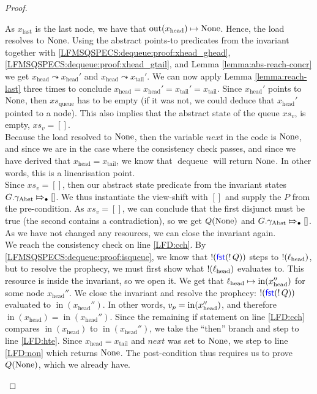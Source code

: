 \documentclass[a4paper, 10pt]{report}
\theoremstyle{definition}
\newcommand{\dequeue}{\operatorname{dequeue}}
\newcommand{\xsqueue}{xs_{\mathrm{queue}}}
\newcommand{\locN}[1]{\loc_{\mathrm{#1}}}
\newcommand{\lochead}{\locN{head}}
\newcommand{\nIn}[1]{\operatorname{in}(#1)}
\newcommand{\nOut}[1]{\operatorname{out}(#1)}
\newcommand{\node}{x}
\newcommand{\nodeN}[1]{\node_{\mathrm{#1}}}
\newcommand{\nodehead}{\nodeN{head}}
\newcommand{\nodetail}{\nodeN{tail}}
\newcommand{\nodelast}{\nodeN{last}}
\newcommand{\absvalueList}{xs_v}
\newcommand{\prophval}{\val_p}
\newcommand{\Qg}{G}
\newcommand{\gabst}{\gname_{\mathrm{Abst}}}
\newcommand{\abstractstateauth}[2]{#1 \Mapsto_{\bullet} #2}
\newcommand{\reach}[2]{#1 \leadsto #2}
\begin{document}
\begin{proof}
\begin{itemize}
\begin{itemize}
      As $\nodelast$ is the last node, we have that $\nOut{\nodehead} \mapsto \None$. Hence, the load resolves to $\operatorname{None}$. Using the abstract points-to predicates from the invariant together with \ref{LFMSQSPECS:dequeue:proof:xhead_ghead}, \ref{LFMSQSPECS:dequeue:proof:xhead_gtail}, and Lemma \ref{lemma:abs-reach-concr} we get $\reach{\nodehead}{\nodehead'}$ and $\reach{\nodehead}{\nodetail'}$. We can now apply Lemma \ref{lemma:reach-last} three times to conclude $\nodehead = \nodehead' = \nodetail' = \nodetail$. Since $\nodehead'$ points to $\operatorname{None}$, then $\xsqueue$ has to be empty (if it was not, we could deduce that $\nodehead'$ pointed to a node). This also implies that the abstract state of the queue $\absvalueList$, is empty, $\absvalueList = []$.\\
      Because the load resolved to $\operatorname{None}$, then the variable $next$ in the code is $\operatorname{None}$, and since we are in the case where the consistency check passes, and since we have derived that $\nodehead = \nodetail$, we know that $\dequeue$ will return $\operatorname{None}$. In other words, this is a linearisation point.\\
      Since $\absvalueList = []$, then our abstract state predicate from the invariant states $\abstractstateauth{\Qg.\gabst}{[]}$. We thus instantiate the view-shift with $[]$ and supply the $P$ from the pre-condition. As $\absvalueList = []$, we can conclude that the first disjunct must be true (the second contains a contradiction), so we get $Q(\operatorname{None})$ and $\abstractstateauth{\Qg.\gabst}{[]}$. As we have not changed any resources, we can close the invariant again.\\
      We reach the consistency check on line \ref{LFD:cch}. By \ref{LFMSQSPECS:dequeue:proof:isqueue}, we know that $\mathop{!}(\operatorname{\textsf{\color{blue} fst}} (\mathop{!} Q))$ steps to $\deref(\lochead)$, but to resolve the prophecy, we must first show what $\deref(\lochead)$ evaluates to. This resource is inside the invariant, so we open it. We get that $\lochead \mapsto \nIn{\nodehead''}$ for some node $\nodehead''$. We close the invariant and resolve the prophecy: $\mathop{!}(\operatorname{\textsf{\color{blue} fst}} (\mathop{!} Q))$ evaluated to $\nIn{\nodehead''}$. In other words, $\prophval = \nIn{\nodehead''}$, and therefore $\nIn{\nodehead} = \nIn{\nodehead''}$. Since the remaining if statement on line \ref{LFD:cch} compares $\nIn{\nodehead}$ to $\nIn{\nodehead''}$, we take the ``then'' branch and step to line \ref{LFD:hte}. Since $\nodehead = \nodetail$ and $next$ was set to $\operatorname{None}$, we step to line \ref{LFD:non} which returns $\operatorname{None}$. The post-condition thus requires us to prove $Q(\operatorname{None})$, which we already have.


\end{itemize}
\end{itemize}
\end{proof}
\end{document}
